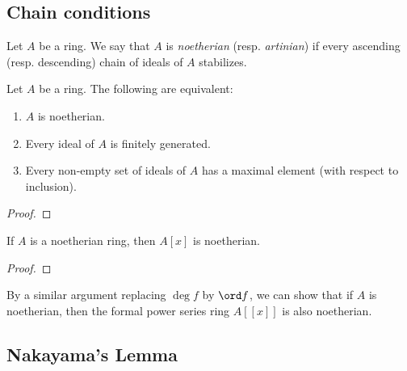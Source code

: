 \subsection{Chain conditions}

    \begin{definition}\label{def:noetherian_and_artinian_rings_and_modules}
        Let \(A\) be a ring.
        We say that \(A\) is \emph{noetherian} (resp. \emph{artinian}) if every ascending (resp. descending) chain of ideals of \(A\) stabilizes.
    \end{definition}

    \begin{proposition}\label{prop:equivalent_definitions_of_noetherian_rings}
        Let \(A\) be a ring.
        The following are equivalent:
        \begin{enumerate}
            \item \(A\) is noetherian.
            \item Every ideal of \(A\) is finitely generated.
            \item Every non-empty set of ideals of \(A\) has a maximal element (with respect to inclusion).
        \end{enumerate}
    \end{proposition}
    \begin{proof}
    \end{proof}

    \begin{theorem}\label{thm:Hilbert_basis_theorem}
        If \(A\) is a noetherian ring, then \(A[x]\) is noetherian.
    \end{theorem}
    \begin{proof}
    \end{proof}

    \begin{remark}\label{rmk:Hilbert_basis_theorem_for_ring_of_power_series}
        By a similar argument replacing \(\deg f\) by \(\ord f\), we can show that if \(A\) is noetherian, then the formal power series ring \(A[[x]]\) is also noetherian.
    \end{remark}

\subsection{Nakayama's Lemma}

